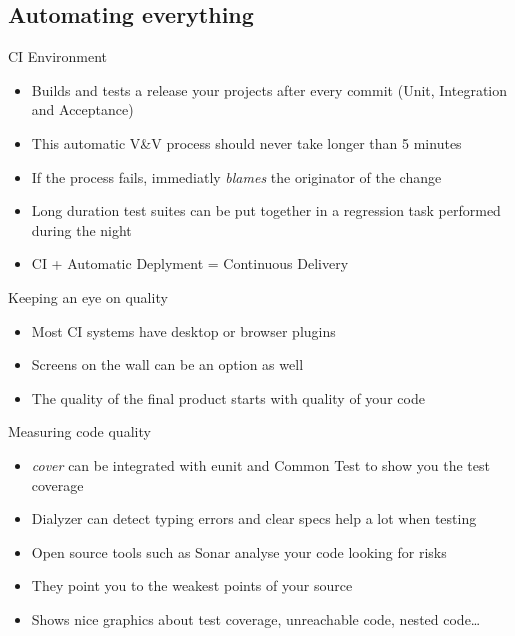 \documentclass[pdf]{beamer}
\begin{document}
\subsection*{Automating everything}
\label{automating_everything}

\begin{frame}{CI Environment}
    \begin{itemize}
    \item Builds and tests a release your projects after every commit (Unit, Integration and Acceptance)
    \pause
    \item This automatic V\&V process should never take longer than 5 minutes
    \pause
    \item If the process fails, immediatly \emph{blames} the originator of the change
    \pause
    \item Long duration test suites can be put together in a regression task performed during the night
    \pause
    \item CI + Automatic Deplyment = Continuous Delivery
    \end{itemize}
\end{frame}

\begin{frame}{Keeping an eye on quality}
    \begin{itemize}
    \item Most CI systems have desktop or browser plugins
    \item Screens on the wall can be an option as well
    \item The quality of the final product starts with quality of your code
    \end{itemize}
\end{frame}

\begin{frame}{Measuring code quality}
    \begin{itemize}
    \item \emph{cover} can be integrated with eunit and Common Test to show you the test coverage
    \item Dialyzer can detect typing errors and clear specs help a lot when testing
    \item Open source tools such as Sonar analyse your code looking for risks
    \item They point you to the weakest points of your source
    \item Shows nice graphics about test coverage, unreachable code, nested code\dots
    \end{itemize}
\end{frame}
\end{document}
